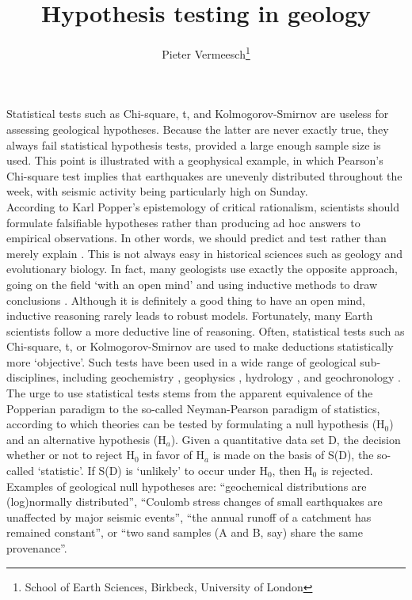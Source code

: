 \documentclass{article}
\title{Hypothesis testing in geology}
\author{Pieter Vermeesch\footnote{School of Earth Sciences,
Birkbeck, University of London}}
\date{}
\begin{document}
\linenumbers
\maketitle

Statistical tests such as Chi-square, t, and Kolmogorov-Smirnov are
useless for assessing geological hypotheses. Because the latter are
never exactly true, they always fail statistical hypothesis tests,
provided a large enough sample size is used. This point is illustrated
with a geophysical example, in which Pearson's Chi-square test implies
that earthquakes are unevenly distributed throughout the week, with
seismic activity being particularly high on Sunday.
\\

According to Karl Popper's epistemology of critical rationalism,
scientists should formulate falsifiable hypotheses rather than
producing ad hoc answers to empirical observations. In other words, we
should predict and test rather than merely explain \citep{popper1959}.
This is not always easy in historical sciences such as geology and
evolutionary biology. In fact, many geologists use exactly the
opposite approach, going on the field `with an open mind' and using
inductive methods to draw conclusions \citep{sengor2001}. Although it
is definitely a good thing to have an open mind, inductive reasoning
rarely leads to robust models. Fortunately, many Earth scientists
follow a more deductive line of reasoning. Often, statistical tests
such as Chi-square, t, or Kolmogorov-Smirnov are used to make
deductions statistically more `objective'. Such tests have been used
in a wide range of geological sub-disciplines, including geochemistry
\citep{reimann2000}, geophysics \citep{Anderson1999}, hydrology
\citep{lorup1998}, and geochronology \citep{sircombe2004}.
\\

The urge to use statistical tests stems from the apparent equivalence
of the Popperian paradigm to the so-called Neyman-Pearson paradigm of
statistics, according to which theories can be tested by formulating a
null hypothesis (H$_0$) and an alternative hypothesis (H$_a$).  Given
a quantitative data set D, the decision whether or not to reject H$_0$
in favor of H$_a$ is made on the basis of S(D), the so-called
`statistic'.  If S(D) is `unlikely' to occur under H$_0$, then H$_0$
is rejected. Examples of geological null hypotheses are: ``geochemical
distributions are (log)normally distributed'', ``Coulomb stress
changes of small earthquakes are unaffected by major seismic events'',
``the annual runoff of a catchment has remained constant'', or ``two
sand samples (A and B, say) share the same provenance''.
\\
\end{document}
